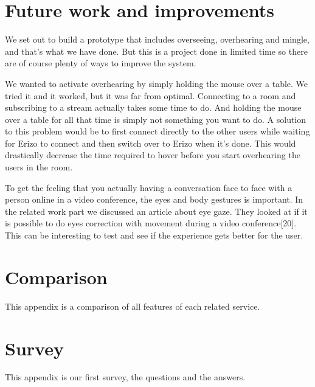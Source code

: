 \documentclass[12pt, titlepage]{article}
\begin{document}
\section{Future work and improvements}
We set out to build a prototype that includes overseeing, overhearing and mingle, and that's what we have done. But this is a project done in limited time so there are of course plenty of ways to improve the system.

We wanted to activate overhearing by simply holding the mouse over a table. We tried it and it worked, but it was far from optimal. Connecting to a room and subscribing to a stream actually takes some time to do. And holding the mouse over a table for all that time is simply not something you want to do. A solution to this problem would be to first connect directly to the other users while waiting for Erizo to connect and then switch over to Erizo when it's done. This would drastically decrease the time required to hover before you start overhearing the users in the room.

To get the feeling that you actually having a conversation face to face with a person online in a video conference, the eyes and body gestures is important. In the related work part we discussed an article about eye gaze. They looked at if it is possible to do eyes correction with movement during a video conference[20]. This can be interesting to test and see if the experience gets better for the user.

\newpage
\begin{appendices}
\section{Comparison}
This appendix is a comparison of all features of each related service.

\section{Survey}
This appendix is our first survey, the questions and the answers.


\end{appendices}
\end{document}
